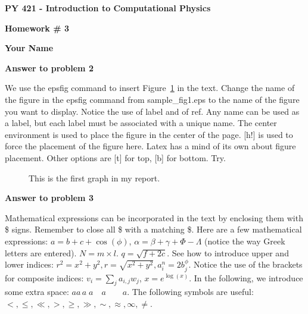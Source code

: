 \documentclass[12pt,dvips]{article}
\begin{document}

\begin{center}
{\Large\bf PY 421 - Introduction to Computational Physics}


\bigskip     

{\large\bf Homework \# 3}
\smallskip

{\large\bf Your Name}
\end{center}

\bigskip
{\bf Answer to problem 2}
\bigskip

We use the epsfig command to insert Figure~\ref{pict1} in the text.
Change the name of the figure in the epsfig command from
sample\_fig1.eps to the name of the figure you want to display.
Notice the use of label and of ref.  Any name can be used as
a label, but each label must be associated with a unique name. 
The center environment is used to place the figure in the center
of the page.
[h!] is used to force the placement of the figure here.  Latex
has a mind of its own about figure placement.  Other options are
[t] for top, [b] for bottom.  Try.

\begin{figure}[h!]
\begin{center}
\end{center}
\caption{\label{pict1}This is the first graph in my report.}
\end{figure}

\vfil\eject
{\bf Answer to problem 3}
\bigskip

Mathematical expressions can be incorporated in the text by enclosing
them with \$ signs.  Remember to close all \$ with a matching \$.
Here are a few mathematical expressions: $a=b+c+\cos(\phi)$,
$\alpha=\beta+\gamma+\Phi-\Lambda$ (notice the way Greek letters
are entered).  $N=m \times l$.  $q=\sqrt{f+2 c}$.  See how to 
introduce upper and lower indices: $r^2=x^2+y^2, r=\sqrt{x^2+y^2},
a_i^n=2 b_j^\phi$.  Notice the use of the brackets for composite
indices: $v_i=\sum_j a_{i,j} w_j$, $x=e^{\log(x)}$.
In the following, we introduce some extra space:
$a a \, a \; a \quad a \qquad a$.  The following symbols are
useful: $ <, \le, \ll, >, \ge, \gg, \sim, \approx, \infty, \ne$.
\end{document}
